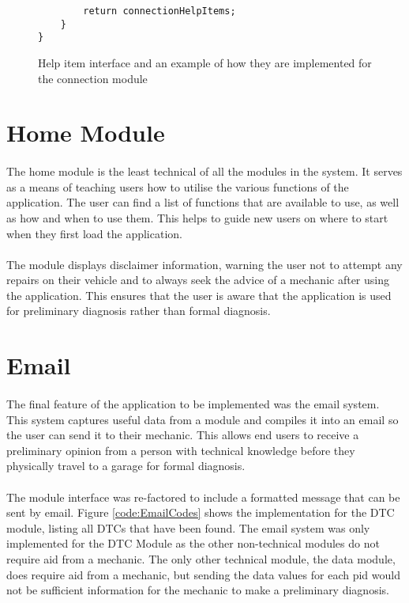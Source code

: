 {\begin{figure}[h]
\begin{lstlisting}
    	return connectionHelpItems;
	}	
}
			\end{lstlisting}
			\caption{Help item interface and an example of how they are implemented for the connection module}
			\label{code:HelpItem}
		\end{figure}
	\newpage
\section{Home Module}
		\paragraph{}{
		The home module is the least technical of all the modules in the system. It serves as a means of teaching users how to utilise the various functions of the application. The user can find a list of functions that are available to use, as well as how and when to use them. This helps to guide new users on where to start when they first load the application.
		}
				
		\paragraph{}{
		The module displays disclaimer information, warning the user not to attempt any repairs on their vehicle and to always seek the advice of a mechanic after using the application. This ensures that the user is aware that the application is used for preliminary diagnosis rather than formal diagnosis.
		}
		

\section{Email}
		\paragraph{}{
		The final feature of the application to be implemented was the email system. This system captures useful data from a module and compiles it into an email so the user can send it to their mechanic. This allows end users to receive a preliminary opinion from a person with technical knowledge before they physically travel to a garage for formal diagnosis.		
		}
		\paragraph{}{
		The module interface was re-factored to include a formatted message that can be sent by email. Figure \ref{code:EmailCodes} shows the implementation for the DTC module, listing all DTCs that have been found. The email system was only implemented for the DTC Module as the other non-technical modules do not require aid from a mechanic. The only other technical module, the data module, does require aid from a mechanic, but sending the data values for each pid would not be sufficient information for the mechanic to make a preliminary diagnosis.
		}

}
